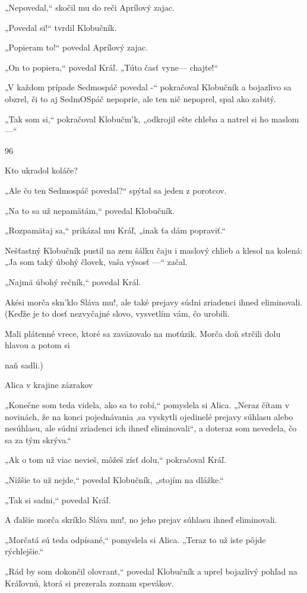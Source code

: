 \documentclass[12pt]{article}
\begin{document}
\begin{Parallel}[p]{}{}
{{„Nepovedal,“ skočil mu do reči Aprílový zajac.

„Povedal si!“ tvrdil Klobučník.

„Popieram to!“ povedal Aprílový zajac.

„On to popiera,“ povedal Kráľ. „Túto časť vyne—
chajte!“

„V každom prípade Sedmospáč povedal -“ pokračoval
Klobučník a bojazlivo sa obzrel, či to aj SedmOSpáč
nepoprie, ale ten nič nepoprel, spal ako zabitý.

„Tak som si,“ pokračoval Klobučm'k, „odkrojil ešte
chleba a natrel si ho maslom —“

96

Kto ukradol koláče?

„Ale čo ten Sedmospáč povedal?“ spýtal sa jeden
z porotcov.

„Na to sa už nepamätám,“ povedal Klobučník.

„Rozpamätaj sa,“ prikázal mu Kráľ, „inak ťa dám
popraviť.“

Nešťastný Klobučník pustil na zem šálku čaju i maslový
chlieb a klesol na kolená: „Ja som taký úbohý človek, vaša
výsosť —“ začal.

„Najmä úbohý rečník,“ povedal Král.

Akési morča skn'klo Sláva mu!, ale také prejavy súdni
zriadenci ihned eliminovali. (Keďže je to dosť nezvyčajné
slovo, vysvetlím vám, čo urobili.

Mali plátenné vrece, ktoré sa
zaväzovalo na motúzik.
Morča doň strčili dolu
hlavou a potom si

naň sadli.)

 

Alica v krajine zázrakov

„Konečne som teda videla, ako sa to robí,“ pomyslela si
Alica. „Neraz čítam v novinách, že na konci pojednávania
,sa vyskytli ojedinelé prejavy súhlasu alebo nesúhlasu, ale
súdni zriadenci ich ihneď eliminovali“, a doteraz som
nevedela, čo sa za tým skrýva.“

„Ak o tom už viac nevieš, môžeš zísť dolu,“ pokračoval
Kráľ.

„Nižšie to už nejde,“ povedal Klobučník, „stojím na
dlážke.“

„Tak si sadni,“ povedal Kráľ.

A ďalšie morča skríklo Sláva mu!, no jeho prejav súhlasu
ihneď eliminovali.

„Morčatá sú teda odpísané,“ pomyslela si Alica. „Teraz
to už iste pôjde rýchlejšie.“

„Rád by som dokončil olovrant,“ povedal Klobučník
a uprel bojazlivý pohľad na Kráľovnú, ktorá si prezerala
zoznam spevákov.

}}
\end{Parallel}
\end{document}
